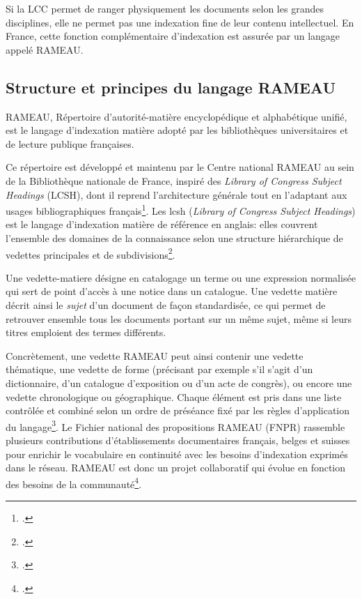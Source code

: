 Si la LCC permet de ranger physiquement les documents selon les grandes disciplines, elle ne permet pas une indexation fine de leur contenu intellectuel. En France, cette fonction complémentaire d'indexation est assurée par un langage appelé RAMEAU. 

\subsection{Structure et principes du langage RAMEAU}
\label{sec:rameau-structure}

RAMEAU, Répertoire d'autorité-matière encyclopédique et alphabétique unifié, est le langage d'indexation matière adopté par les bibliothèques universitaires et de lecture publique françaises. 

Ce répertoire est développé et maintenu par le Centre national RAMEAU au sein de la Bibliothèque nationale de France, inspiré des \textit{Library of Congress Subject Headings} (LCSH), dont il reprend l'architecture générale tout en l'adaptant aux usages bibliographiques français\footcite{rameaubnf}. Les \gls{lcsh} (\textit{Library of Congress Subject Headings}) est le langage d'indexation matière de référence en anglais: elles couvrent l'ensemble des domaines de la connaissance selon une structure hiérarchique de vedettes principales et de subdivisions\footcite{locsubjectheadings}.

Une \gls{vedette-matiere} désigne en catalogage un terme ou une expression normalisée qui sert de point d'accès à une notice dans un catalogue. Une vedette matière décrit ainsi le \emph{sujet} d'un document de façon standardisée, ce qui permet de retrouver ensemble tous les documents portant sur un même sujet, même si leurs titres emploient des termes différents.


Concrètement, une vedette RAMEAU peut ainsi contenir une vedette thématique, une vedette de forme (précisant par exemple s'il s'agit d'un dictionnaire, d'un catalogue d'exposition ou d'un acte de congrès), ou encore une vedette chronologique ou géographique. Chaque élément est pris dans une liste contrôlée et combiné selon un ordre de préséance fixé par les règles d'application du langage\footcite{rameaubnf}. Le Fichier national des propositions RAMEAU (FNPR) rassemble plusieurs contributions d'établissements documentaires français, belges et suisses pour enrichir le vocabulaire en continuité avec les besoins d'indexation exprimés dans le réseau. RAMEAU est donc un projet collaboratif qui évolue en fonction des besoins de la communauté\footcite{rameauopendata}.

